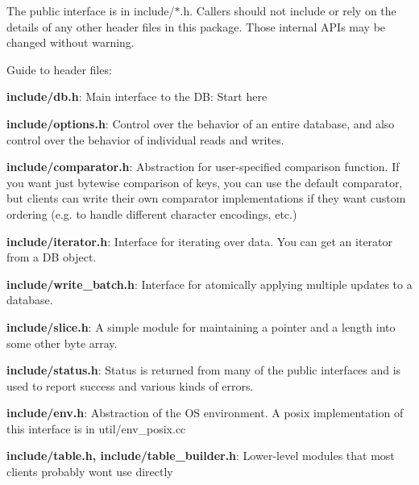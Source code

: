 The public interface is in include/$\ast$.h. Callers should not include or rely on the details of any other header files in this package. Those internal A\+P\+Is may be changed without warning.

Guide to header files\+:


\begin{DoxyItemize}
\item {\bfseries include/db.\+h}\+: Main interface to the DB\+: Start here
\item {\bfseries include/options.\+h}\+: Control over the behavior of an entire database, and also control over the behavior of individual reads and writes.
\item {\bfseries include/comparator.\+h}\+: Abstraction for user-\/specified comparison function. If you want just bytewise comparison of keys, you can use the default comparator, but clients can write their own comparator implementations if they want custom ordering (e.\+g. to handle different character encodings, etc.)
\item {\bfseries include/iterator.\+h}\+: Interface for iterating over data. You can get an iterator from a DB object.
\item {\bfseries include/write\+\_\+batch.\+h}\+: Interface for atomically applying multiple updates to a database.
\item {\bfseries include/slice.\+h}\+: A simple module for maintaining a pointer and a length into some other byte array.
\item {\bfseries include/status.\+h}\+: Status is returned from many of the public interfaces and is used to report success and various kinds of errors.
\item {\bfseries include/env.\+h}\+: Abstraction of the OS environment. A posix implementation of this interface is in util/env\+\_\+posix.\+cc
\item {\bfseries include/table.\+h, include/table\+\_\+builder.\+h}\+: Lower-\/level modules that most clients probably won\textquotesingle{}t use directly 
\end{DoxyItemize}